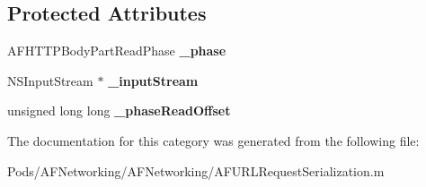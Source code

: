 \subsection*{Protected Attributes}
\begin{DoxyCompactItemize}
\item 
\mbox{\label{category_a_f_h_t_t_p_body_part_07_08_a9e462f49c6b01eb159ee18e4dfa9f2dc}} 
A\+F\+H\+T\+T\+P\+Body\+Part\+Read\+Phase {\bfseries \+\_\+phase}
\item 
\mbox{\label{category_a_f_h_t_t_p_body_part_07_08_a3ff59819a038e5b89a041b6e59b9f858}} 
N\+S\+Input\+Stream $\ast$ {\bfseries \+\_\+input\+Stream}
\item 
\mbox{\label{category_a_f_h_t_t_p_body_part_07_08_ab23d067a3e044b62a837e737042cd721}} 
unsigned long long {\bfseries \+\_\+phase\+Read\+Offset}
\end{DoxyCompactItemize}


The documentation for this category was generated from the following file\+:\begin{DoxyCompactItemize}
\item 
Pods/\+A\+F\+Networking/\+A\+F\+Networking/A\+F\+U\+R\+L\+Request\+Serialization.\+m\end{DoxyCompactItemize}
